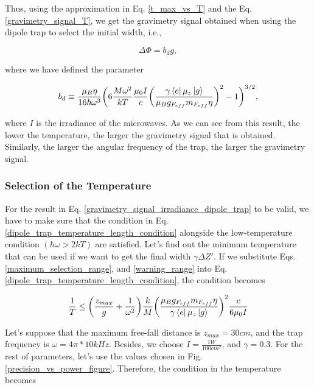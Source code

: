 \documentclass{article}
\begin{document}
Thus, using the approximation in Eq. \ref{t_max_vs_T} and the Eq. \ref{gravimetry_signal_T}, we get the gravimetry signal obtained when using the dipole trap to select the initial width, i.e.,

\begin{equation}\label{gravimetry_signal_irradiance_dipole_trap}
    \Delta \Phi = b_{d} g, 
\end{equation}

where we have defined the parameter

\begin{equation}
    b_{d} \equiv \frac{\mu_{B} \eta}{16 \hbar \omega^{3}} \bigg(6 \frac{M \omega^{2}}{kT} \frac{\mu_{0} I}{c} \bigg(\frac{ \gamma  \bra{e} \mu_{z} \ket{g}}{\mu_{B} g_{F_{eff}} m_{F_{eff}} \eta}\bigg)^{2} - 1\bigg)^{3/2},
\end{equation}

where $I$ is the irradiance of the microwaves. As we can see from this result, the lower the temperature, the larger the gravimetry signal that is obtained. Similarly, the larger the angular frequency of the trap, the larger the gravimetry signal.

\subsubsection{Selection of the Temperature}
For the result in Eq. \ref{gravimetry_signal_irradiance_dipole_trap} to be valid, we have to make sure that the condition in Eq. \ref{dipole_trap_temperature_length_condition} alongside the low-temperature condition $(\hbar \omega > 2kT)$ are satisfied. Let's find out the minimum temperature that can be used if we want to get the final width $\gamma \Delta Z'$. If we substitute Eqs. \ref{maximum_selection_range}, and \ref{warning_range} into Eq. \ref{dipole_trap_temperature_length_condition}, the condition becomes

\begin{equation}
    \frac{1}{T} \le \bigg( \frac{z_{max}}{g} + \frac{1}{\omega^{2}} \bigg) \frac{k}{M} \bigg( \frac{\mu_{B} g_{F_{eff}} m_{F_{eff}} \eta}{\gamma  \bra{e} \mu_{z} \ket{g}} \bigg)^{2}  \frac{c}{6 \mu_{0} I}
\end{equation}

Let's suppose that the maximum free-fall distance is $z_{max}=30cm$, and the trap frequency is $\omega = 4\pi*10kHz$. Besides, we choose $I=\frac{1W}{100 cm^{2}}$, and $\gamma=0.3$.  For the rest of parameters, let's use the values chosen in Fig. \ref{precision_vs_power_figure}. Therefore, the condition in the temperature becomes
\end{document}
